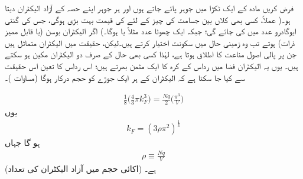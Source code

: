 فرض کریں مادہ کے ایک ٹکڑا میں  جوہر پائے جاتے ہوں اور ہر جوہر اپنے حصہ کے  آزاد الیکٹران دیتا ہو۔( عملاً، کسی بھی کلاں بین جسامت کی چیز کے لئے  کی قیمت بہت بڑی ہوگی، جس کی گنتی ایوگادرو عدد میں کی جائے گی؛ جبکہ  ایک چھوٹا عدد مثلاً  یا  ہوگا۔) اگر الیکٹران بوسن (یا قابل ممیز ذرات) ہوتے تب وہ زمینی حال  میں سکونت اختیار کرتے ہیں۔لیکن، حقیقت میں الیکٹران متماثل  ہیں جن پر پالی اصول مناعت کا اطلاق ہوتا ہے، لہٰذا کسی بھی حال کے صرف دو الیکٹران مکین ہو سکتے ہیں۔ یوں یہ الیکٹران  فضا میں رداس  کے کرہ کا ایک مثمن  بھرتے ہیں؛ اس رداس کا تعین اس حقیقت سے کیا جا سکتا ہے کہ الیکٹران کے ہر ایک جوڑے کو  حجم درکار ہوگا (مساوات )۔

	\begin{align*}
		\frac{1}{8}\big(\frac{4}{3} \pi k^{3}_F\big ) = \frac{Nq}{2}\big (\frac{\pi^3}{V}\big )
	\end{align*}
یوں
\begin{align}\label{مساوات_متماثل_مستطیل_الف}
	k_F =(3\rho\pi^{2})^{\frac{1}{3}}
\end{align}
ہو گا جہاں
\begin{align}\label{مساوات_متماثل_مستطیل_ب}
	\rho \equiv \frac{Nq}{V}
\end{align}
 (اکائی حجم میں آزاد الیکٹران کی تعداد) ہے۔


